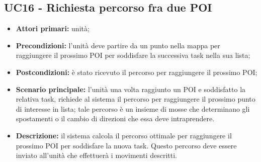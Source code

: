 \subsection{UC16 - Richiesta percorso fra due POI}
\begin{itemize}
	\item 	\textbf{Attori primari:} unità;
	\item 	\textbf{Precondizioni:} l'unità deve partire da un punto nella mappa per raggiungere il prossimo POI per soddisfare la successiva task nella sua lista;
	\item 	\textbf{Postcondizioni:} è stato ricevuto il percorso per raggiungere il prossimo POI;
	\item 	\textbf{Scenario principale:} l'unità una volta raggiunto un POI e soddisfatto la relativa task, richiede al sistema il percorso per raggiungere il prossimo punto di interesse in lista; tale percorso è un insieme di mosse che determinano gli spostamenti o il cambio di direzioni che essa deve intraprendere.
	\item 	\textbf{Descrizione:} il sistema calcola il percorso ottimale per raggiungere il prossimo POI per soddisfare la nuova task. Questo percorso deve essere inviato all'unità che effettuerà i movimenti descritti.
	
\end{itemize}